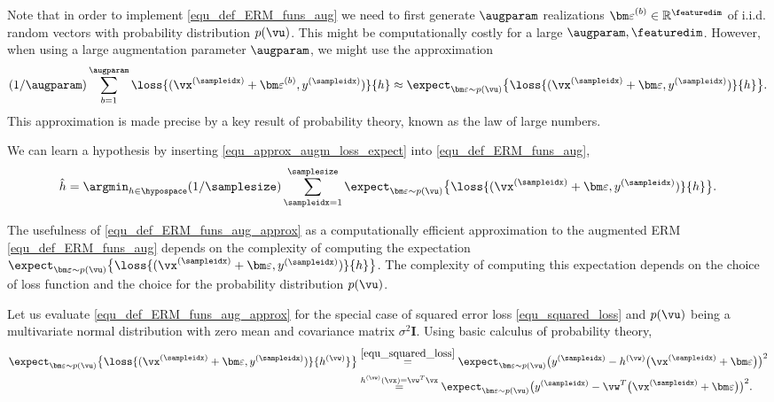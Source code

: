 \documentclass[12pt]{report}
\newcommand{\featurelen}{\featuredim}
\begin{document}
Note that in order to implement \eqref{equ_def_ERM_funs_aug} we need to first generate 
$\augparam$ realizations  ${\bm \varepsilon}^{(b)} \in \mathbb{R}^{\featurelen}$ of i.i.d.
random vectors with probability distribution $p(\vu)$. 
This might be computationally costly for a large $\augparam, \featurelen$. 
However, when using a large augmentation parameter $\augparam$, we might 
use the approximation  
\begin{align}
\label{equ_approx_augm_loss_expect}
 (1/\augparam)\sum_{b=1}^{\augparam} \loss{(\vx^{(\sampleidx)}+{\bm \varepsilon}^{(b)},y^{(\sampleidx)})}{h} \approx  
 \expect_{{\bm \varepsilon} \sim p(\vu) } \big\{ \loss{(\vx^{(\sampleidx)}+{\bm \varepsilon},y^{(\sampleidx)})}{h} \big\}. 
\end{align}
This approximation is made precise by a key result of probability theory, known as the law of large numbers. 

We can learn a hypothesis by inserting \eqref{equ_approx_augm_loss_expect} into \eqref{equ_def_ERM_funs_aug}, 
\begin{align}
\label{equ_def_ERM_funs_aug_approx}
\hat{h}  = \argmin_{h \in \hypospace} (1/\samplesize) \sum_{\sampleidx=1}^{\samplesize} \expect_{{\bm \varepsilon} \sim p(\vu) } \big\{ \loss{(\vx^{(\sampleidx)}+{\bm \varepsilon},y^{(\sampleidx)})}{h} \big\}. 
\end{align}


The usefulness of \eqref{equ_def_ERM_funs_aug_approx} as a computationally efficient approximation to 
the augmented ERM \eqref{equ_def_ERM_funs_aug} depends on the complexity of computing the 
expectation $\expect_{{\bm \varepsilon} \sim p(\vu) } \big\{ \loss{(\vx^{(\sampleidx)}+{\bm \varepsilon},y^{(\sampleidx)})}{h} \big\}$. 
The complexity of computing this expectation depends on the choice of loss function and the 
choice for the probability distribution $p(\vu)$.  

Let us evaluate \eqref{equ_def_ERM_funs_aug_approx} for the special case of squared error loss \eqref{equ_squared_loss} 
and $p(\vu)$ being a multivariate normal distribution with zero mean and covariance matrix $\sigma^{2} \mathbf{I}$. Using 
basic calculus of probability theory, 
 \begin{align} 
 \label{equ_implicit_aug_regu_1}
 \expect_{{\bm \varepsilon} \sim p(\vu) } \big\{ \loss{(\vx^{(\sampleidx)}+{\bm \varepsilon},y^{(\sampleidx)})}{h^{(\vw)}} \big\} & \stackrel{\eqref{equ_squared_loss}}{=}
  \expect_{{\bm \varepsilon} \sim p(\vu) } \big( y^{(\sampleidx)} - h^{(\vw)} \big(\vx^{(\sampleidx)}+{\bm \varepsilon} \big)\big)^{2}  \nonumber \\
  & \stackrel{h^{(\vw)}(\vx) = \vw^{T} \vx}{=}  \expect_{{\bm \varepsilon} \sim p(\vu) }\big( y^{(\sampleidx)} - \vw^{T} \big(\vx^{(\sampleidx)}+{\bm \varepsilon} \big) \big)^{2}.
\end{align}
\end{document}
